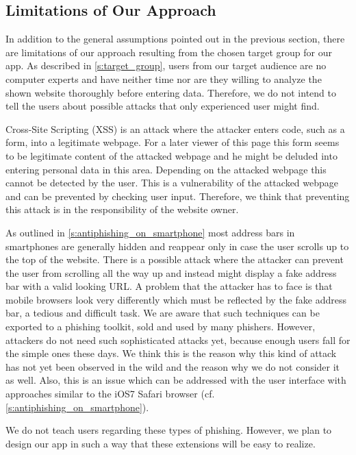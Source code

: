 \subsection{Limitations of Our Approach}
In addition to the general assumptions pointed out in the previous section, there are limitations of our approach resulting from the chosen target group for our app.
As described in \autoref{s:target_group}, users from our target audience are no computer experts and have neither time nor are they willing to analyze the shown website thoroughly before entering data.
Therefore, we do not intend to tell the users about possible attacks that only experienced user might find.
\begin{description}[leftmargin=0cm]
	\item[Cross-Site Scripting:]
	Cross-Site Scripting (XSS) is an attack where the attacker enters code, such as a form, into a legitimate webpage.
	For a later viewer of this page this form seems to be legitimate content of the attacked webpage and he might be deluded into entering personal data in this area. 
	Depending on the attacked webpage this cannot be detected by the user.
	This is a vulnerability of the attacked webpage and can be prevented by checking user input.
	Therefore, we think that preventing this attack is in the responsibility of the website owner.
	\item[URL Hiding Techniques:]
	As outlined in \autoref{s:antiphishing_on_smartphone} most address bars in smartphones are generally hidden and reappear only in case the user scrolls up to the top of the website.
	There is a possible attack where the attacker can prevent the user from scrolling all the way up and instead might display a fake address bar with a valid looking URL.
	A problem that the attacker has to face is that mobile browsers look very differently which must be reflected by the fake address bar, a tedious and difficult task.
	We are aware that such techniques can be exported to a phishing toolkit, sold and used by many phishers. However, attackers do not need such sophisticated attacks yet, because enough users fall for the simple ones these days. 
	We think this is the reason why this kind of attack has not yet been observed in the wild and the reason why we do not consider it as well.
Also, this is an issue which can be addressed with the user interface with approaches similar to the iOS7 Safari browser (cf. \autoref{s:antiphishing_on_smartphone}).
\end{description}
We do not teach users regarding these types of phishing. However, we plan to design our app in such a way that these extensions will be easy to realize.